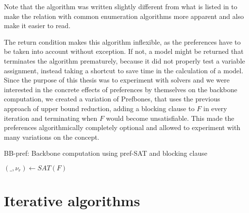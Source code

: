 Note that the algorithm was written slightly different from what is listed in \cite{PJ18} to make the relation with common enumeration algorithms more apparent and also make it easier to read.

The return condition makes this algorithm inflexible, as the preferences have to be taken into account without exception. If not, a model might be returned that terminates the algorithm prematurely, because it did not properly test a variable assignment, instead taking a shortcut to save time in the calculation of a model. Since the purpose of this thesis was to experiment with solvers and we were interested in the concrete effects of preferences by themselves on the backbone computation, we created a variation of Prefbones, that uses the previous approach of upper bound reduction, adding a blocking clause to $F$ in every iteration and terminating when $F$ would become unsatisfiable. This made the preferences algorithmically completely optional and allowed to experiment with many variations on the concept.

\begin{algorithm}
\caption{{\sc BB-pref: Backbone computation using pref-SAT and blocking clause}}
\DontPrintSemicolon
{}

$(\_,\nu_r) \gets SAT(F)$\;

\end{algorithm}


\section{Iterative algorithms}

